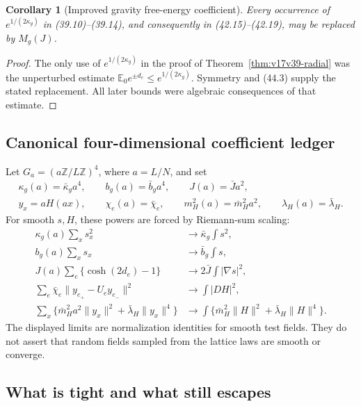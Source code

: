 \documentclass[11pt]{article}
\newtheorem{corollary}[theorem]{Corollary}
\theoremstyle{remark}
\begin{document}
\begin{corollary}[Improved gravity free-energy coefficient]
\label{cor:v17v44-free}
Every occurrence of \(e^{1/(2\kappa_g)}\) in
(39.10)--(39.14), and consequently in
(42.15)--(42.19), may be replaced by \(M_g(J)\).
\end{corollary}

\begin{proof}
The only use of \(e^{1/(2\kappa_g)}\) in the proof of
Theorem~\ref{thm:v17v39-radial} was the unperturbed estimate
\(\mathbb E_0e^{\pm d_e}\leq e^{1/(2\kappa_g)}\).
Symmetry and (44.3) supply the stated replacement.  All later bounds
were algebraic consequences of that estimate.
\end{proof}

\subsection{Canonical four-dimensional coefficient ledger}

Let \(G_a=(a\mathbb Z/L\mathbb Z)^4\), where \(a=L/N\), and set
\[
\begin{gathered}
 \kappa_g(a)=\bar\kappa_g a^4,\qquad
 b_g(a)=\bar b_g a^4,\qquad
 J(a)=\bar J a^2,                                  \tag{44.10}\\
 y_x=aH(ax),\qquad
 \chi_e(a)=\bar\chi_e,\qquad
 m_H^2(a)=\bar m_H^2a^2,\qquad
 \lambda_H(a)=\bar\lambda_H.                       \tag{44.11}
\end{gathered}
\]
For smooth \(s,H\), these powers are forced by Riemann-sum scaling:
\[
\begin{aligned}
 \kappa_g(a)\sum_xs_x^2
 &\longrightarrow\bar\kappa_g\int s^2,\\
 b_g(a)\sum_xs_x
 &\longrightarrow\bar b_g\int s,\\
 J(a)\sum_e\{\cosh(2d_e)-1\}
 &\longrightarrow2\bar J\int|\nabla s|^2,          \tag{44.12}\\
 \sum_e\bar\chi_e\|y_{e_+}-U_ey_{e_-}\|^2
 &\longrightarrow\int|D H|^2,\\
 \sum_x\{\bar m_H^2a^2\|y_x\|^2+
 \bar\lambda_H\|y_x\|^4\}
 &\longrightarrow\int\{\bar m_H^2\|H\|^2+
 \bar\lambda_H\|H\|^4\}.
\end{aligned}
\]
The displayed limits are normalization identities for smooth test
fields.  They do not assert that random fields sampled from the lattice
laws are smooth or converge.

\subsection{What is tight and what still escapes}
\end{document}
